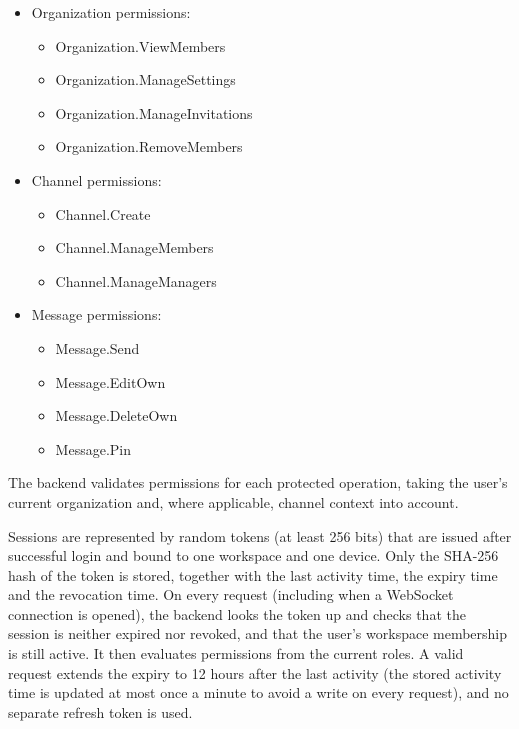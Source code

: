 \documentclass[
    english, %
]{VUMIFPSkursinis}
\begin{document}
\begin{itemize}
    \item Organization permissions:
    \begin{itemize}
        \item Organization.ViewMembers
        \item Organization.ManageSettings
        \item Organization.ManageInvitations
        \item Organization.RemoveMembers
    \end{itemize}

    \item Channel permissions:
    \begin{itemize}
        \item Channel.Create
        \item Channel.ManageMembers
        \item Channel.ManageManagers
    \end{itemize}

    \item Message permissions:
    \begin{itemize}
        \item Message.Send
        \item Message.EditOwn
        \item Message.DeleteOwn
        \item Message.Pin
    \end{itemize}
\end{itemize}

The backend validates permissions for each protected operation, taking the user's current organization and, where applicable, channel context into account.

Sessions are represented by random tokens (at least 256 bits) that are issued after successful login and bound to one workspace and one device. Only the SHA-256 hash of the token is stored, together with the last activity time, the expiry time and the revocation time. On every request (including when a WebSocket connection is opened), the backend looks the token up and checks that the session is neither expired nor revoked, and that the user's workspace membership is still active. It then evaluates permissions from the current roles. A valid request extends the expiry to 12 hours after the last activity (the stored activity time is updated at most once a minute to avoid a write on every request), and no separate refresh token is used.
\end{document}
